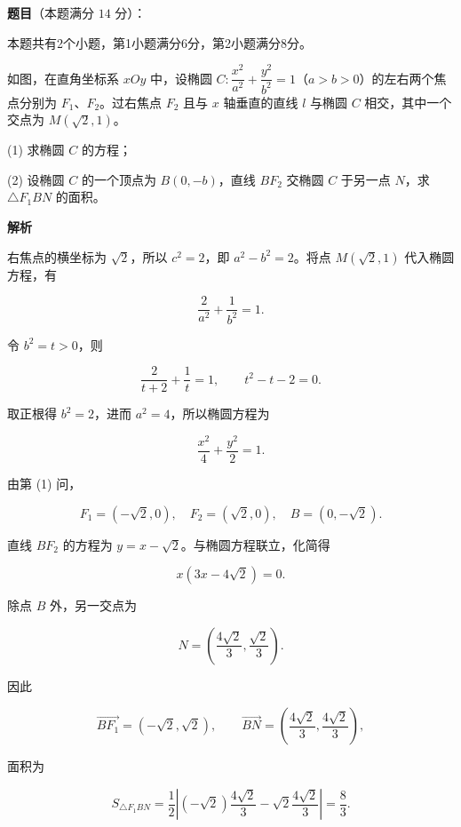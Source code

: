 \begin{answer}

\textbf{题目}（本题满分 $14$ 分）：

本题共有2个小题，第1小题满分6分，第2小题满分8分。

如图，在直角坐标系 $xOy$ 中，设椭圆 $C:\dfrac{x^2}{a^2}+\dfrac{y^2}{b^2}=1$（$a>b>0$）的左右两个焦点分别为 $F_1$、$F_2$。过右焦点 $F_2$ 且与 $x$ 轴垂直的直线 $l$ 与椭圆 $C$ 相交，其中一个交点为 $M(\sqrt2,1)$。

(1) 求椭圆 $C$ 的方程；

(2) 设椭圆 $C$ 的一个顶点为 $B(0,-b)$，直线 $BF_2$ 交椭圆 $C$ 于另一点 $N$，求 $\triangle F_1BN$ 的面积。
\nopagebreak[4]
\begin{center}\end{center}
\nopagebreak[4]
\textbf{解析}


右焦点的横坐标为 $\sqrt2$，所以 $c^2=2$，即 $a^2-b^2=2$。将点 $M(\sqrt2,1)$ 代入椭圆方程，有

\nopagebreak[4]
\[
\frac2{a^2}+\frac1{b^2}=1.
\]

令 $b^2=t>0$，则

\nopagebreak[4]
\[
\frac2{t+2}+\frac1t=1,
\qquad t^2-t-2=0.
\]

取正根得 $b^2=2$，进而 $a^2=4$，所以椭圆方程为

\nopagebreak[4]
\[
\frac{x^2}{4}+\frac{y^2}{2}=1.
\]


由第 (1) 问，

\nopagebreak[4]
\[
F_1=(-\sqrt2,0),\quad F_2=(\sqrt2,0),\quad B=(0,-\sqrt2).
\]

直线 $BF_2$ 的方程为 $y=x-\sqrt2$。与椭圆方程联立，化简得

\nopagebreak[4]
\[
x(3x-4\sqrt2)=0.
\]

除点 $B$ 外，另一交点为

\nopagebreak[4]
\[
N=\left(\frac{4\sqrt2}{3},\frac{\sqrt2}{3}\right).
\]

因此

\nopagebreak[4]
\[
\overrightarrow{BF_1}=(-\sqrt2,\sqrt2),\qquad
\overrightarrow{BN}=\left(\frac{4\sqrt2}{3},\frac{4\sqrt2}{3}\right),
\]

面积为

\nopagebreak[4]
\[
S_{\triangle F_1BN}
=\frac12\left|(-\sqrt2)\frac{4\sqrt2}{3}
-\sqrt2\frac{4\sqrt2}{3}\right|
=\frac83.
\]



\end{answer}

